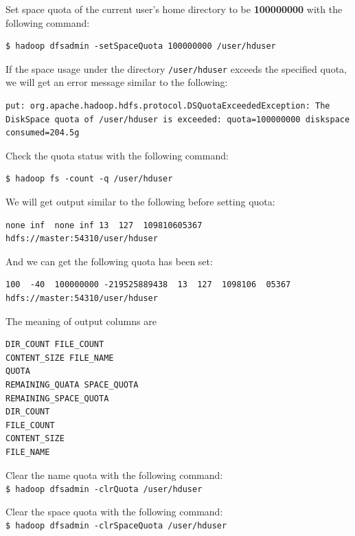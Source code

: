 Set space quota of the current user's home directory to be \textbf{100000000} with the following command:
\lstset{style=bashstyle}
\begin{lstlisting}
$ hadoop dfsadmin -setSpaceQuota 100000000 /user/hduser
\end{lstlisting}

If the space usage under the directory \verb|/user/hduser| exceeds the specified quota, we will get an error message similar to the following: \\
\lstset{style=bashstyle}
\begin{lstlisting}
put: org.apache.hadoop.hdfs.protocol.DSQuotaExceededException: The DiskSpace quota of /user/hduser is exceeded: quota=100000000 diskspace consumed=204.5g
\end{lstlisting}

Check the quota status with the following command:
\lstset{style=bashstyle}
\begin{lstlisting}
$ hadoop fs -count -q /user/hduser
\end{lstlisting}
We will get output similar to the following before setting quota: \\
\lstset{style=bashstyle}
\begin{lstlisting}
none inf  none inf 13  127  109810605367 hdfs://master:54310/user/hduser
\end{lstlisting}

And we can get the following quota has been set:
\lstset{style=bashstyle}
\begin{lstlisting}
100  -40  100000000 -219525889438  13  127  1098106  05367 hdfs://master:54310/user/hduser
\end{lstlisting}

The meaning of output columns are 
\begin{verbatim}
DIR_COUNT FILE_COUNT 
CONTENT_SIZE FILE_NAME
QUOTA
REMAINING_QUATA SPACE_QUOTA
REMAINING_SPACE_QUOTA
DIR_COUNT 
FILE_COUNT 
CONTENT_SIZE 
FILE_NAME
\end{verbatim}

Clear the name quota with the following command: \\
\verb|$ hadoop dfsadmin -clrQuota /user/hduser|

Clear the space quota with the following command: \\
\verb|$ hadoop dfsadmin -clrSpaceQuota /user/hduser|

